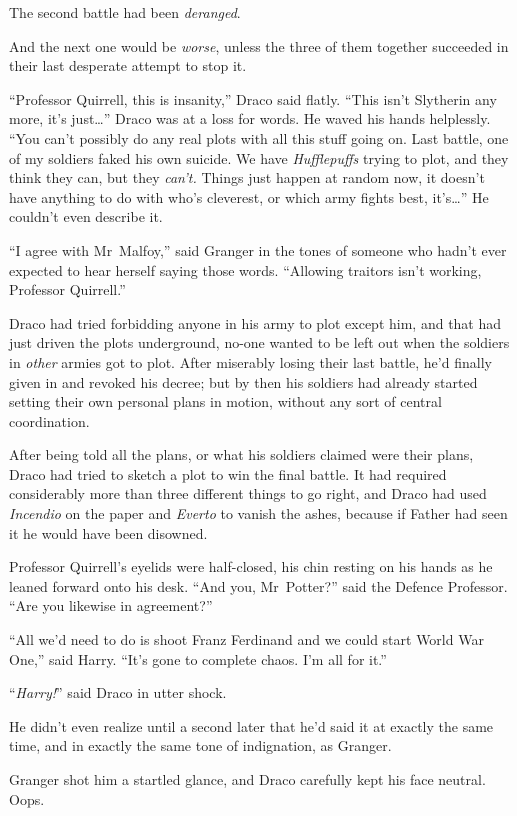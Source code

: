 The second battle had been \emph{deranged}.

And the next one would be \emph{worse}, unless the three of them together succeeded in their last desperate attempt to stop it.

“Professor Quirrell, this is insanity,” Draco said flatly. “This isn’t Slytherin any more, it’s just…” Draco was at a loss for words. He waved his hands helplessly. “You can’t possibly do any real plots with all this stuff going on. Last battle, one of my soldiers faked his own suicide. We have \emph{Hufflepuffs} trying to plot, and they think they can, but they \emph{can’t.} Things just happen at random now, it doesn’t have anything to do with who’s cleverest, or which army fights best, it’s…” He couldn’t even describe it.

“I agree with Mr~Malfoy,” said Granger in the tones of someone who hadn’t ever expected to hear herself saying those words. “Allowing traitors isn’t working, Professor Quirrell.”

Draco had tried forbidding anyone in his army to plot except him, and that had just driven the plots underground, no-one wanted to be left out when the soldiers in \emph{other} armies got to plot. After miserably losing their last battle, he’d finally given in and revoked his decree; but by then his soldiers had already started setting their own personal plans in motion, without any sort of central coordination.

After being told all the plans, or what his soldiers claimed were their plans, Draco had tried to sketch a plot to win the final battle. It had required considerably more than three different things to go right, and Draco had used \emph{Incendio} on the paper and \emph{Everto} to vanish the ashes, because if Father had seen it he would have been disowned.

Professor Quirrell’s eyelids were half-closed, his chin resting on his hands as he leaned forward onto his desk. “And you, Mr~Potter?” said the Defence Professor. “Are you likewise in agreement?”

“All we’d need to do is shoot Franz Ferdinand and we could start World War One,” said Harry. “It’s gone to complete chaos. I’m all for it.”

“\emph{Harry!}” said Draco in utter shock.

He didn’t even realize until a second later that he’d said it at exactly the same time, and in exactly the same tone of indignation, as Granger.

Granger shot him a startled glance, and Draco carefully kept his face neutral. Oops.

